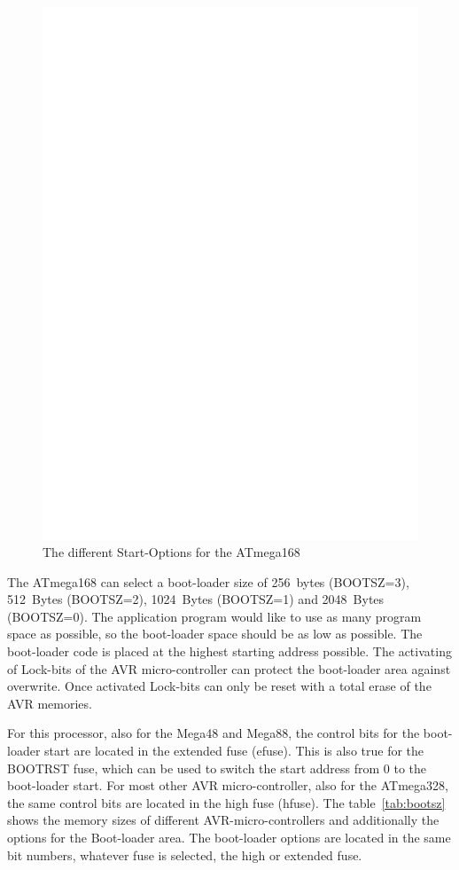 \begin{figure}[H]
\centering
\includegraphics[width=12cm]{../FIG/boot_pages.eps}
\caption{The different Start-Options for the ATmega168}
\label{fig:pages}
\end{figure}


The ATmega168 can select a boot-loader size of 256~bytes (BOOTSZ=3),
512~Bytes (BOOTSZ=2), 1024~Bytes (BOOTSZ=1) and 2048~Bytes (BOOTSZ=0).
The application program would like to use as many program space as
possible, so the boot-loader space should be as low as possible.
The boot-loader code is placed at the highest starting address possible.
The activating of Lock-bits of the AVR micro-controller can protect
the boot-loader area against overwrite.
Once activated Lock-bits can only be reset with a total erase of the
AVR memories.

For this processor, also for the Mega48 and Mega88, the control bits
for the boot-loader start are located in the extended fuse (efuse).
This is also true for the BOOTRST fuse, which can be used to switch
the start address from 0 to the boot-loader start.
For most other AVR micro-controller, also for the ATmega328, the same
control bits are located in the high fuse (hfuse).
The table~\ref{tab:bootsz} shows the memory sizes of different
AVR-micro-controllers and additionally the options for the Boot-loader area. 
The boot-loader options are located in the same bit numbers,
whatever fuse is selected, the high or extended fuse.

